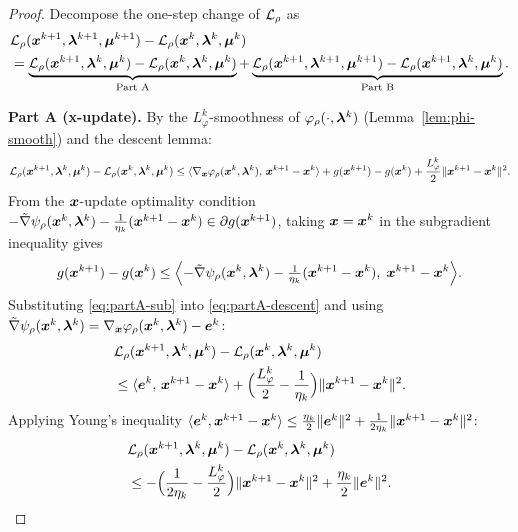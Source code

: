 \documentclass[10pt]{article}
\begin{document}
\begin{proof}
Decompose the one-step change of $\mathcal{L}_\rho$ as
\begin{align}
  &\mathcal{L}_\rho(\bm{x}^{k+1},\bm{\lambda}^{k+1},\bm{\mu}^{k+1})
   - \mathcal{L}_\rho(\bm{x}^k,\bm{\lambda}^k,\bm{\mu}^k) \notag\\
  &= \underbrace{
      \mathcal{L}_\rho(\bm{x}^{k+1},\bm{\lambda}^k,\bm{\mu}^k)
    - \mathcal{L}_\rho(\bm{x}^k,\bm{\lambda}^k,\bm{\mu}^k)
    }_{\text{Part A}}
  + \underbrace{
      \mathcal{L}_\rho(\bm{x}^{k+1},\bm{\lambda}^{k+1},\bm{\mu}^{k+1})
    - \mathcal{L}_\rho(\bm{x}^{k+1},\bm{\lambda}^k,\bm{\mu}^k)
    }_{\text{Part B}}.
  \label{eq:decompose}
\end{align}

\medskip\noindent\textbf{Part A (x-update).}
By the $L_\varphi^k$-smoothness of $\varphi_\rho(\cdot,\bm{\lambda}^k)$
(Lemma~\ref{lem:phi-smooth}) and the descent lemma:
\begin{equation}
  \mathcal{L}_\rho(\bm{x}^{k+1},\bm{\lambda}^k,\bm{\mu}^k)
  - \mathcal{L}_\rho(\bm{x}^k,\bm{\lambda}^k,\bm{\mu}^k)
  \leq \langle \nabla_{\bm{x}}\varphi_\rho(\bm{x}^k,\bm{\lambda}^k),\, \bm{x}^{k+1}-\bm{x}^k\rangle
       + g(\bm{x}^{k+1}) - g(\bm{x}^k)
       + \frac{L_\varphi^k}{2}\|\bm{x}^{k+1}-\bm{x}^k\|^2.
  \label{eq:partA-descent}
\end{equation}
From the $\bm{x}$-update optimality condition
$-\tilde{\nabla}\psi_\rho(\bm{x}^k,\bm{\lambda}^k)
 - \frac{1}{\eta_k}(\bm{x}^{k+1}-\bm{x}^k) \in \partial g(\bm{x}^{k+1})$,
taking $\bm{x} = \bm{x}^k$ in the subgradient inequality gives
\begin{equation}
  g(\bm{x}^{k+1}) - g(\bm{x}^k)
  \leq \Bigl\langle
    -\tilde{\nabla}\psi_\rho(\bm{x}^k,\bm{\lambda}^k)
    - \tfrac{1}{\eta_k}(\bm{x}^{k+1}-\bm{x}^k),\;
    \bm{x}^{k+1}-\bm{x}^k
  \Bigr\rangle.
  \label{eq:partA-sub}
\end{equation}
Substituting \eqref{eq:partA-sub} into \eqref{eq:partA-descent}
and using
$\tilde{\nabla}\psi_\rho(\bm{x}^k,\bm{\lambda}^k)
= \nabla_{\bm{x}}\varphi_\rho(\bm{x}^k,\bm{\lambda}^k) - \bm{e}^k$:
\begin{align}
  &\mathcal{L}_\rho(\bm{x}^{k+1},\bm{\lambda}^k,\bm{\mu}^k)
  - \mathcal{L}_\rho(\bm{x}^k,\bm{\lambda}^k,\bm{\mu}^k) \notag\\
  &\leq \langle \bm{e}^k,\, \bm{x}^{k+1}-\bm{x}^k\rangle
       + \Bigl(\frac{L_\varphi^k}{2} - \frac{1}{\eta_k}\Bigr)
         \|\bm{x}^{k+1}-\bm{x}^k\|^2.
\end{align}
Applying Young's inequality
$\langle \bm{e}^k, \bm{x}^{k+1}-\bm{x}^k\rangle
 \leq \frac{\eta_k}{2}\|\bm{e}^k\|^2
    + \frac{1}{2\eta_k}\|\bm{x}^{k+1}-\bm{x}^k\|^2$:
\begin{align}
  &\mathcal{L}_\rho(\bm{x}^{k+1},\bm{\lambda}^k,\bm{\mu}^k)
  - \mathcal{L}_\rho(\bm{x}^k,\bm{\lambda}^k,\bm{\mu}^k) \notag\\
  &\leq -\Bigl(\frac{1}{2\eta_k} - \frac{L_\varphi^k}{2}\Bigr)
        \|\bm{x}^{k+1}-\bm{x}^k\|^2
       + \frac{\eta_k}{2}\|\bm{e}^k\|^2.
  \label{eq:partA-bound}
\end{align}


\end{proof}
\end{document}
